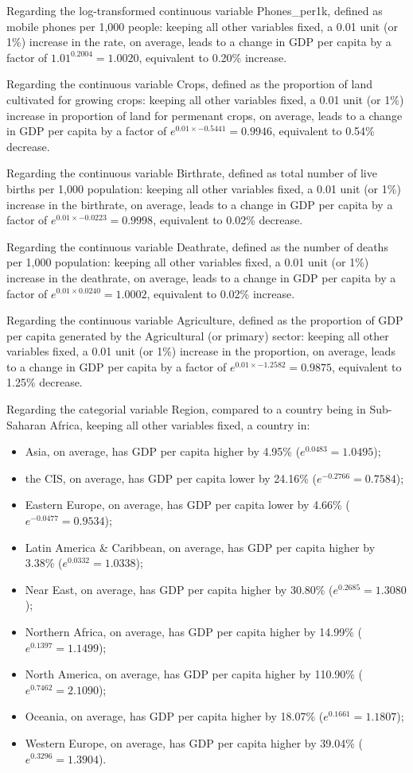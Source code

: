 \documentclass[12pt,a4paper]{article}
\renewcommand\texttt[1]{{\ttfamily\color{ttcolor}#1}}
\begin{document}
Regarding the log-transformed continuous variable \texttt{Phones\_per1k}, defined as mobile phones per 1,000 people: keeping all other variables fixed, a 0.01 unit (or 1\%) increase in the rate, on average, leads to a change in GDP per capita by a factor of $1.01^{0.2004}=1.0020$, equivalent to 0.20\% increase. 

Regarding the continuous variable \texttt{Crops}, defined as the proportion of land cultivated for growing crops: keeping all other variables fixed, a 0.01 unit (or 1\%) increase in proportion of land for permenant crops, on average, leads to a change in GDP per capita by a factor of $e^{0.01 \times -0.5441}=0.9946$, equivalent to 0.54\% decrease. 

Regarding the continuous variable \texttt{Birthrate}, defined as total number of live births per 1,000 population: keeping all other variables fixed, a 0.01 unit (or 1\%) increase in the birthrate, on average, leads to a change in GDP per capita by a factor of $e^{0.01 \times -0.0223}=0.9998$, equivalent to 0.02\% decrease.

Regarding the continuous variable \texttt{Deathrate}, defined as the number of deaths per 1,000 population: keeping all other variables fixed, a 0.01 unit (or 1\%) increase in the deathrate, on average, leads to a change in GDP per capita by a factor of $e^{0.01 \times 0.0240}=1.0002$, equivalent to 0.02\% increase.

Regarding the continuous variable \texttt{Agriculture}, defined as the proportion of GDP per capita generated by the Agricultural (or primary) sector: keeping all other variables fixed, a 0.01 unit (or 1\%) increase in the proportion, on average, leads to a change in GDP per capita by a factor of $e^{0.01 \times -1.2582}=0.9875$, equivalent to 1.25\% decrease.

Regarding the categorial variable \texttt{Region}, compared to a country being in Sub-Saharan Africa, keeping all other variables fixed, a country in:
\begin{itemize}[noitemsep,topsep=0pt]
\item Asia, on average, has GDP per capita higher by 4.95\% ($e^{0.0483}=1.0495$);
\item the CIS, on average, has GDP per capita lower by 24.16\% ($e^{-0.2766}=0.7584$);
\item Eastern Europe, on average, has GDP per capita lower by 4.66\% ($e^{-0.0477}=0.9534$);
\item Latin America \& Caribbean, on average, has GDP per capita higher by 3.38\% ($e^{0.0332}=1.0338$);
\item Near East, on average, has GDP per capita higher by 30.80\% ($e^{0.2685}=1.3080$);
\item Northern Africa, on average, has GDP per capita higher by 14.99\% ($e^{0.1397}=1.1499$);
\item North America, on average, has GDP per capita higher by 110.90\% ($e^{0.7462}=2.1090$);
\item Oceania, on average, has GDP per capita higher by 18.07\% ($e^{0.1661}=1.1807$);
\item Western Europe, on average, has GDP per capita higher by 39.04\% ($e^{0.3296}=1.3904$).
\end{itemize}
\end{document}
